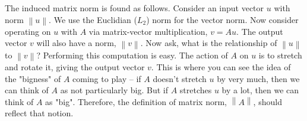 \documentclass[onefignum,onetabnum]{siamart190516}
\begin{document}
The induced matrix norm is found as follows.  Consider an input vector
$u$ with norm $\left\lVert {u}\right\rVert$.  We use the Euclidian ($L_2$) norm for the vector
norm.  Now consider operating on $u$ with $A$ via matrix-vector
multiplication, $v = A u$.
The output vector $v$ will also have a norm,  $\left\lVert {v}\right\rVert$.  Now ask, what is the
relationship of  $\left\lVert{u}\right\rVert$ to  $\left\lVert{v}\right\rVert$?  
Performing this computation is easy.
The action of $A$ on $u$ is to stretch and rotate it, giving the output
vector $v$.
This is where you can see the idea of the
"bigness" of $A$ coming to play -- if $A$ doesn't stretch $u$ by very much,
then we can think of $A$ as not particularly big.  But if $A$ stretches $u$
by a lot, then we can think of $A$ as "big".  
Therefore, the definition of matrix norm, $\left\lVert{A}\right\rVert$,
should reflect that notion.
\end{document}

